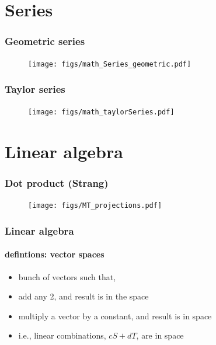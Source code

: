 \section{Series}
\begin{frame}
\frametitle{Geometric series}
\framesubtitle{}
\logoCSIPCPL\mypagenum\mypagenum
	\begin{figure}
		\texttt{[image: figs/math\_Series\_geometric.pdf]}
	\end{figure}
\end{frame}


\begin{frame}
\frametitle{Taylor series}
\framesubtitle{}
\logoCSIPCPL\mypagenum\mypagenum
	\begin{figure}				
		\texttt{[image: figs/math\_taylorSeries.pdf]}
	\end{figure}
\end{frame}

\section{Linear algebra}
\begin{frame}
\frametitle{Dot product (Strang)}
\framesubtitle{}
\logoCSIPCPL\mypagenum\mypagenum
	\begin{figure}				
		\texttt{[image: figs/MT\_projections.pdf]}
	\end{figure}	
\end{frame}


\begin{frame}
\frametitle{Linear algebra}
\framesubtitle{defintions: vector spaces}
\logoCSIPCPL\mypagenum\mypagenum
	\begin{itemize}
		\item bunch of vectors such that,
		\item add any 2, and result is in the space
		\item multiply a vector by a constant, and result is in space
		\item i.e., linear combinations, $cS + dT$, are in space
	\end{itemize}
\end{frame}

